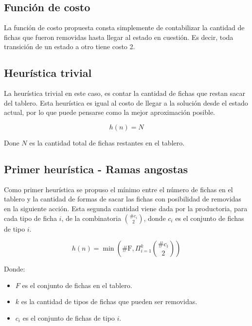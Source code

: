 \documentclass[a4paper,10pt]{article}
\begin{document}
    \subsection{Función de costo}

    La función de costo propuesta consta simplemente de contabilizar la cantidad de fichas que fueron removidas hasta llegar al estado en cuestión. Es decir, toda transición
    de un estado a otro tiene costo 2. \\

    \subsection{Heurística trivial}

    La heurística trivial en este caso, es contar la cantidad de fichas que restan sacar del tablero. Esta heurística es igual al costo de llegar a la solución desde el estado 
    actual, por lo que puede pensarse como la mejor aproximación posible.

    \[ h(n) = N \] 

    Done $N$ es la cantidad total de fichas restantes en el tablero.

    \subsection{Primer heurística - Ramas angostas}
        
    Como primer heurística se propuso el mínimo entre el número de fichas en el tablero y la cantidad de formas de sacar las fichas con posibilidad de removidas 
    en la siguiente acción. Esta segunda cantidad viene dada por la productoria, para cada tipo de ficha $i$, de la combinatoria ${ \# c_i \choose 2}$,  
    donde $c_i$ es el conjunto de fichas de tipo $i$.

    \[ h(n) = \min \left (\text{\# F}, \Pi_{i=1}^{k} {\# c_i \choose 2} \right )\] 

    Donde:
    \begin{itemize}
        \item $F$ es el conjunto de fichas en el tablero.
        \item $k$ es la cantidad de tipos de fichas que pueden ser removidas.
        \item $c_i$ es el conjunto de fichas de tipo $i$.
    \end{itemize}
\end{document}
